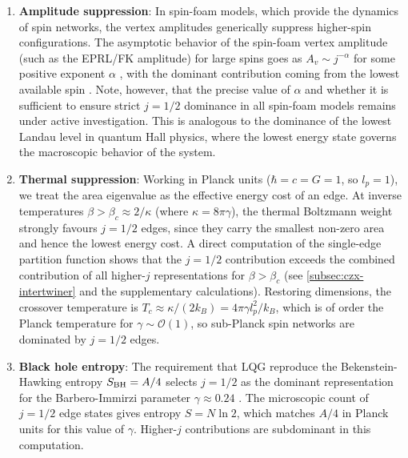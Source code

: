 \documentclass[preprint]{SciPost}
\theoremstyle{plain} %
\begin{document}
\begin{enumerate}
	\item \textbf{Amplitude suppression}: In spin-foam models, which provide the dynamics of spin networks, the vertex amplitudes generically suppress higher-spin configurations. The asymptotic behavior of the spin-foam vertex amplitude (such as the EPRL/FK amplitude) for large spins goes as $ A_v \sim j^{-\alpha} $ for some positive exponent $ \alpha $ \cite{Dona2020Numerical,Dona2022Asymptotics}, with the dominant contribution coming from the lowest available spin \cite{Perez2013The-Spin-Foam}. Note, however, that the precise value of $ \alpha $ and whether it is sufficient to ensure strict $ j = 1/2 $ dominance in all spin-foam models remains under active investigation. This is analogous to the dominance of the lowest Landau level in quantum Hall physics, where the lowest energy state governs the macroscopic behavior of the system.

	\item \textbf{Thermal suppression}: Working in Planck units ($\hbar = c = G = 1$, so $l_p=1$), we treat the area eigenvalue as the effective energy cost of an edge. At inverse temperatures $\beta > \beta_c \approx 2/\kappa$ (where $\kappa = 8\pi\gamma$), the thermal Boltzmann weight strongly favours $j=1/2$ edges, since they carry the smallest non-zero area and hence the lowest energy cost. A direct computation of the single-edge partition function shows that the $j=1/2$ contribution exceeds the combined contribution of all higher-$j$ representations for $\beta > \beta_c$ (see \autoref{subsec:czx-intertwiner} and the supplementary calculations). Restoring dimensions, the crossover temperature is $T_c \approx \kappa/(2k_B) = 4\pi\gamma l_p^2/k_B$, which is of order the Planck temperature for $\gamma \sim \mathcal{O}(1)$, so sub-Planck spin networks are dominated by $j=1/2$ edges.

	\item \textbf{Black hole entropy}: The requirement that LQG reproduce the Bekenstein-Hawking entropy $ S_{\rm BH} = A/4 $ selects $ j = 1/2 $ as the dominant representation for the Barbero-Immirzi parameter $ \gamma \approx 0.24 $ \cite{Domagala2004Black-hole,Meissner2004Black-hole}. The microscopic count of $ j = 1/2 $ edge states gives entropy $ S = N \ln 2 $, which matches $ A/4 $ in Planck units for this value of $ \gamma $. Higher-$ j $ contributions are subdominant in this computation.
\end{enumerate}
\end{document}
